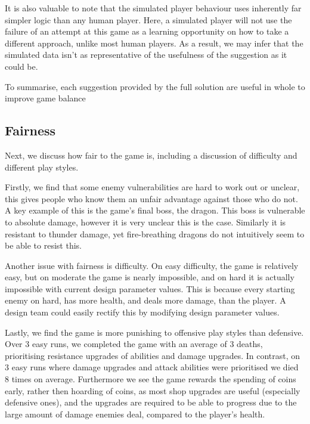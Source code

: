 It is also valuable to note that the simulated player behaviour uses
inherently far simpler logic than any human player. Here, a simulated
player will not use the failure of an attempt at this game as a learning
opportunity on how to take a different approach, unlike most human
players. As a result, we may infer that the simulated data isn't as
representative of the usefulness of the suggestion as it could be.

To summarise, each suggestion provided by the full solution are
useful in whole to improve game balance

\subsection{Fairness}


Next, we discuss how fair to the game is, including a discussion of difficulty and different play styles. 

Firstly, we find that some enemy vulnerabilities are hard to work out or unclear, this gives people who know them an unfair advantage against those who do not. A key example of this is the game's final boss, the dragon. This boss is vulnerable to absolute damage, however it is very unclear this is the case. Similarly it is resistant to thunder damage, yet fire-breathing dragons do not intuitively seem to be able to resist this. 

Another issue with fairness is difficulty. On easy difficulty, the game is relatively easy, but on moderate the game is nearly impossible, and on hard it is actually impossible with current design parameter values. This is because every starting enemy on hard, has more health, and deals more damage, than the player. A design team could easily rectify this by modifying design parameter values. 

Lastly, we find the game is more punishing to offensive play styles than defensive. Over 3 easy runs, we completed the game with an average of 3 deaths, prioritising resistance upgrades of abilities and damage upgrades. In contrast, on 3 easy runs where damage upgrades and attack abilities were prioritised we died 8 times on average. Furthermore we see the game rewards the spending of coins early, rather then hoarding of coins, as most shop upgrades are useful (especially defensive ones), and the upgrades are required to be able to progress due to the large amount of damage enemies deal, compared to the player's health. 

